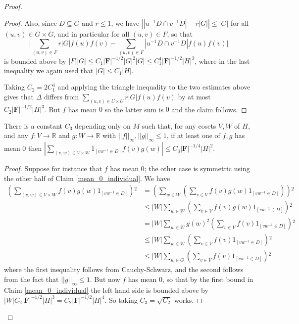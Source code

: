 \documentclass[10pt]{article}
\begin{document}
{\begin{proof}
\begin{proof}
    Also, since $D\subseteq G$ and $r\leqslant 1$, we have $\left||u^{-1}D\cap v^{-1}D|-r|G|\right|\leqslant |G|$ for all $(u,v)\in G\times G$, and in particular for all $(u,v)\in F$, so that $$\bigg|\sum_{(u,v)\in F}r|G|f(u)f(v)-\sum_{(u,v)\in  F}|u^{-1}D\cap v^{-1}D|f(u)f(v)\bigg|$$ is bounded above by $|F||G|\leqslant C_1|\mathbf{F}|^{-1/2}|G|^2|G|\leqslant C_1^4|\mathbf{F}|^{-1/2}|H|^3$, where in the last inequality we again used that $|G|\leqslant C_1|H|$.
    
    Taking $C_2=2C_1^4$ and applying the triangle inequality to the two estimates above gives that $\Delta$ differs from $\sum_{(u,v)\in U\times U}r|G|f(u)f(v)$ by at most $C_2|\mathbf{F}|^{-1/2}|H|^3$. But $f$ has mean $0$ so the latter sum is $0$ and the claim follows.
\end{proof}

\begin{claim}\label{mean_0_both}
    There is a constant $C_3$ depending only on $M$ such that, for any cosets $V,W$ of $H$, and any $f:V\to\mathbb{R}$ and $g:W\to\mathbb{R}$ with $||f||_\infty,||g||_\infty\leqslant 1$, if at least one of $f,g$ has mean $0$ then $|\sum_{(v,w)\in V\times W}1_{[vw^{-1}\in D]}f(v)g(w)|\leqslant C_3|\mathbf{F}|^{-1/4}|H|^2$.
\end{claim}

\begin{proof}
    Suppose for instance that $f$ has mean $0$; the other case is symmetric using the other half of Claim \ref{mean_0_individual}. We have
    \begin{align*}
    \left(\sum_{(v,w)\in V\times W}f(v)g(w)1_{[vw^{-1}\in D]}\right){}^2&=\left(\sum_{w\in W}\left(\sum_{v\in V}f(v)g(w)1_{[vw^{-1}\in D]}\right)\right){}^2\\
    &\leqslant |W|\sum_{w\in W}\left(\sum_{v\in V}f(v)g(w)1_{[vw^{-1}\in D]}\right){}^2 \\
    &=|W|\sum_{w\in W}g(w)^2\left(\sum_{v\in V}f(v)1_{[vw^{-1}\in D]}\right){}^2 \\
    &\leqslant |W|\sum_{w\in W}\left(\sum_{v\in V}f(v)1_{[vw^{-1}\in D]}\right){}^2 \\
    &\leqslant |W|\sum_{w\in G}\left(\sum_{v\in V}f(v)1_{[vw^{-1}\in D]}\right){}^2
\end{align*} where the first inequality follows from Cauchy-Schwarz, and the second follows from the fact that $||g||_\infty\leqslant 1$. But now $f$ has mean $0$, so that by the first bound in Claim \ref{mean_0_individual} the left hand side is bounded above by $|W|C_2|\mathbf{F}|^{-1/2}|H|^3= C_2|\mathbf{F}|^{-1/2}|H|^4$. So taking $C_3=\sqrt{C_2}$ works.
\end{proof}


\end{proof}}
\end{document}
